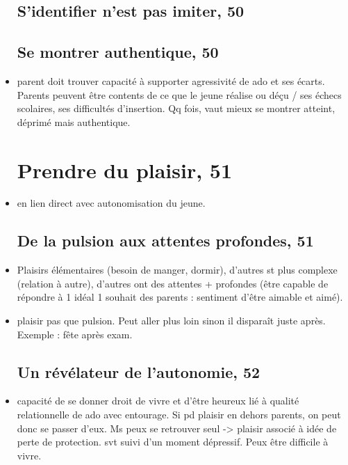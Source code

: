 \documentclass[12pt]{report}
\begin{document}
\begin{itemize}
\subsection{S'identifier n'est pas imiter, 50}

\subsection{Se montrer authentique, 50}

\item parent doit trouver capacité à supporter agressivité de ado et ses écarts. Parents peuvent être contents de ce que le jeune réalise ou déçu / ses échecs scolaires, ses difficultés d'insertion. Qq fois, vaut mieux se montrer atteint, déprimé mais authentique.

\section{Prendre du plaisir, 51}

\item en lien direct avec autonomisation du jeune.

\subsection{De la pulsion aux attentes profondes, 51}

\item Plaisirs élémentaires (besoin de manger, dormir), d'autres st plus complexe (relation à autre), d'autres ont des attentes + profondes (être capable de répondre à 1 idéal 1 souhait des parents : sentiment d'être aimable et aimé). \\

\item plaisir pas que pulsion. Peut aller plus loin sinon il disparaît juste après. Exemple : fête après exam.
 

\subsection{Un révélateur de l'autonomie, 52}

\item capacité de se donner droit de vivre et d'être heureux lié à qualité relationnelle de ado avec entourage. Si pd plaisir en dehors parents, on peut donc se passer d'eux. Ms peux se retrouver seul -> plaisir associé à idée de perte de protection. svt suivi d'un moment dépressif. Peux être difficile à vivre. 


\end{itemize}
\end{document}
